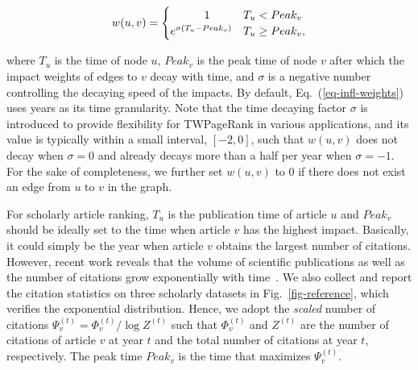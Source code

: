 \vspace{-1ex}
\begin{small}
\begin{equation} \label{eq-infl-weights}
w(u,v)  =  \begin{cases}  \hspace{7ex} 1 & T_u <  Peak_v \\
  e^{\sigma(T_u-Peak_v)} & T_u \geq Peak_v,
\end{cases}
\end{equation}
\end{small}
%
\noindent where $T_u$ is the time of node $u$, $Peak_v$ is the peak time of node $v$ after which the impact weights of edges to $v$ decay with time, and $\sigma$ is a negative number controlling the decaying speed of the impacts.
By default, Eq.~(\ref{eq-infl-weights}) uses years as its time granularity. Note that the time decaying factor $\sigma$ is introduced to provide flexibility for TWPageRank in various applications, and its value is typically within a small interval, \eg $[-2,0]$, such that $w(u,v)$ does not decay when $\sigma=0$ and already decays more than a half per year when $\sigma=-1$.
For the sake of completeness, we further set $w(u,v)$ to $0$ if there does not exist an edge from $u$ to $v$ in the graph.


For scholarly article ranking, $T_u$ is the publication time of article $u$ and $Peak_v$ should be ideally set to the time when article $v$ has the highest impact. Basically, it could simply be the year when article $v$ obtains the largest number of citations. However, recent work reveals that the volume of scientific publications as well as the number of citations grow exponentially with time~\cite{Dong2017KDD,BornmannM15}. We also collect and report the citation statistics on three scholarly datasets in Fig.~\ref{fig-reference}, which verifies the exponential distribution. Hence, we adopt the {\em scaled} number of citations $\Psi_v^{(t)}=\Phi_v^{(t)} / \log Z^{(t)}$ such that $\Phi_v^{(t)}$ and $Z^{(t)}$ are the number of citations of article $v$ at year $t$ and the total number of citations at year $t$, respectively. The peak time $Peak_v$ is the time that maximizes $\Psi_v^{(t)}$.




